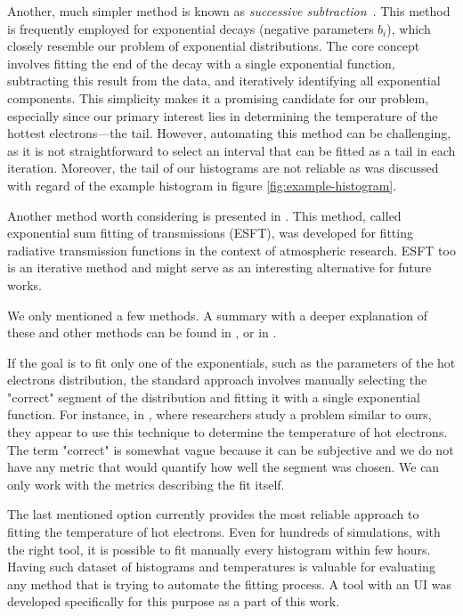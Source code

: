 Another, much simpler method is known as \textit{successive subtraction}~\cite{wiscombe1977}. This method is frequently employed for exponential decays (negative parameters $b_i$), which closely resemble our problem of exponential distributions. The core concept involves fitting the end of the decay with a single exponential function, subtracting this result from the data, and iteratively identifying all exponential components. This simplicity makes it a promising candidate for our problem, especially since our primary interest lies in determining the temperature of the hottest electrons—the tail. However, automating this method can be challenging, as it is not straightforward to select an interval that can be fitted as a tail in each iteration. Moreover, the tail of our histograms are not reliable as was discussed with regard of the example histogram in figure \ref{fig:example-histogram}.

Another method worth considering is presented in \cite{wiscombe1977}. This method, called exponential sum fitting of transmissions (ESFT), was developed for fitting radiative transmission functions in the context of atmospheric research. ESFT too is an iterative method and might serve as an interesting alternative for future works.

We only mentioned a few methods. A summary with a deeper explanation of these and other methods can be found in \cite{wiscombe1977}, \cite{holmstrom2002} or in \cite{hokanson2013}.

If the goal is to fit only one of the exponentials, such as the parameters of the hot electrons distribution, the standard approach involves manually selecting the "correct" segment of the distribution and fitting it with a single exponential function. For instance, in \cite{cui2013}, where researchers study a problem similar to ours, they appear to use this technique to determine the temperature of hot electrons. The term "correct" is somewhat vague because it can be subjective and we do not have any metric that would quantify how well the segment was chosen. We can only work with the metrics describing the fit itself.

The last mentioned option currently provides the most reliable approach to fitting the temperature of hot electrons. Even for hundreds of simulations, with the right tool, it is possible to fit manually every histogram within few hours. Having such dataset of histograms and temperatures is valuable for evaluating any method that is trying to automate the fitting process. A tool with an UI was developed specifically for this purpose as a part of this work.

